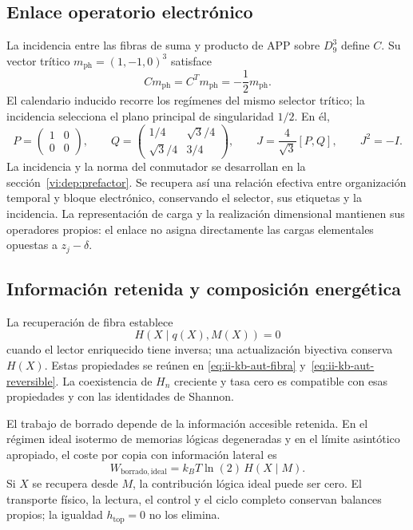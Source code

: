 \subsection{Enlace operatorio electrónico}
\label{md:cron:electron}

La incidencia entre las fibras de suma y producto de APP sobre $D_9^3$
define $C$. Su vector trítico
$m_{\mathrm{ph}}=(1,-1,0)^3$ satisface
\begin{equation}
 Cm_{\mathrm{ph}}=C^Tm_{\mathrm{ph}}
 =-\frac12m_{\mathrm{ph}}.
 \label{md:cron:modo-tritico}
\end{equation}
El calendario inducido recorre los regímenes del mismo selector trítico;
la incidencia selecciona el plano principal de singularidad $1/2$.
En él,
\begin{equation}
 P=\begin{pmatrix}1&0\\0&0\end{pmatrix},\qquad
 Q=\begin{pmatrix}1/4&\sqrt3/4\\\sqrt3/4&3/4\end{pmatrix},
 \qquad J=\frac4{\sqrt3}[P,Q],\qquad J^2=-I.
 \label{md:cron:plano-electronico}
\end{equation}
La incidencia y la norma del conmutador se desarrollan en la
sección~\ref{vi:dep:prefactor}. Se recupera así una relación efectiva entre
organización temporal y bloque electrónico, conservando el selector,
sus etiquetas y la incidencia. La representación de carga y la realización
dimensional mantienen sus operadores propios: el enlace no asigna
directamente las cargas elementales opuestas a $z_j-\delta$.

\subsection{Información retenida y composición energética}
\label{md:cron:informacion-energia}

La recuperación de fibra establece
\begin{equation}
 H(X\mid q(X),M(X))=0
 \label{md:cron:inversa-enriquecida}
\end{equation}
cuando el lector enriquecido tiene inversa; una actualización biyectiva
conserva $H(X)$. Estas propiedades se reúnen en
\eqref{eq:ii-kb-aut-fibra} y~\eqref{eq:ii-kb-aut-reversible}.
La coexistencia de $H_n$ creciente y tasa cero es compatible con esas
propiedades y con las identidades de Shannon.

El trabajo de borrado depende de la información accesible retenida.
En el régimen ideal isotermo de memorias lógicas degeneradas y en el
límite asintótico apropiado, el coste por copia con información lateral es
\begin{equation}
 W_{\mathrm{borrado,ideal}}
 =k_BT\ln(2)\,H(X\mid M).
 \label{md:cron:borrado}
\end{equation}
Si $X$ se recupera desde $M$, la contribución lógica ideal puede ser cero.
El transporte físico, la lectura, el control y el ciclo completo conservan
balances propios; la igualdad $h_{\mathrm{top}}=0$ no los elimina.

